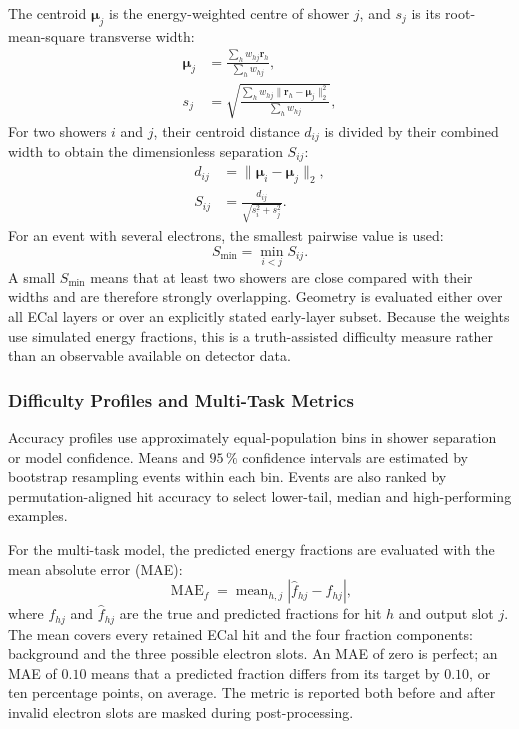 The centroid \(\boldsymbol\mu_j\) is the energy-weighted centre of shower
\(j\), and \(s_j\) is its root-mean-square transverse width:
\begin{align}
    \boldsymbol{\mu}_j
    &=
    \frac{\sum_h w_{hj}\boldsymbol r_h}
         {\sum_h w_{hj}},
    \label{eq:projected_shower_centroid} \\
    s_j
    &=
    \sqrt{
    \frac{\sum_h w_{hj}
    \lVert\boldsymbol r_h-\boldsymbol\mu_j\rVert_2^2}
         {\sum_h w_{hj}}},
    \label{eq:projected_shower_width}
\end{align}
For two showers \(i\) and \(j\), their centroid distance \(d_{ij}\) is divided
by their combined width to obtain the dimensionless separation \(S_{ij}\):
\begin{align}
    d_{ij}
    &=
    \lVert\boldsymbol\mu_i-\boldsymbol\mu_j\rVert_2,
    \label{eq:shower_centroid_distance} \\
    S_{ij}
    &=
    \frac{d_{ij}}{\sqrt{s_i^{2}+s_j^{2}}}.
    \label{eq:normalised_shower_separation}
\end{align}
For an event with several electrons, the smallest pairwise value is used:
\begin{equation}
     S_{\min}=\min_{i<j}S_{ij}.
    \label{eq:min_shower_separation}
\end{equation}
A small \(S_{\min}\) means that at least two showers are close compared with
their widths and are therefore strongly overlapping. Geometry is evaluated
either over all ECal layers or over an explicitly stated early-layer subset.
Because the weights use simulated energy fractions, this is a truth-assisted
difficulty measure rather than an observable available on detector data.

\subsubsection{Difficulty Profiles and Multi-Task Metrics}

Accuracy profiles use approximately equal-population bins in shower
separation or model confidence. Means and \(95\,\%\) confidence intervals are
estimated by bootstrap resampling events within each bin. Events are also
ranked by permutation-aligned hit accuracy to select lower-tail, median and
high-performing examples.

For the multi-task model, the predicted energy fractions are evaluated with
the mean absolute error (MAE):
\begin{equation}
    \operatorname{MAE}_{f}
    =
    \operatorname{mean}_{h,j}
    \left|\widehat f_{hj}-f_{hj}\right|,
    \label{eq:fraction_mae}
\end{equation}
where \(f_{hj}\) and \(\widehat f_{hj}\) are the true and predicted fractions
for hit \(h\) and output slot \(j\). The mean covers every retained ECal hit
and the four fraction components: background and the three possible electron
slots. An MAE of zero is perfect; an MAE of \(0.10\) means that a predicted
fraction differs from its target by \(0.10\), or ten percentage points, on
average. The metric is reported both before and after invalid electron slots
are masked during post-processing.


